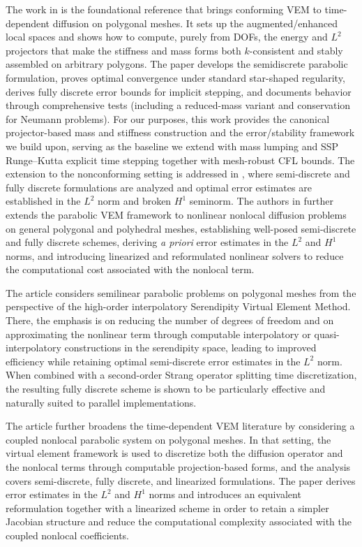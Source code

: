 \documentclass{article}
\begin{document}
The work in \cite{vacca2015parabolic} is the foundational reference that brings conforming VEM to time-dependent diffusion on polygonal meshes. It sets up the augmented/enhanced local spaces and shows how to compute, purely from DOFs, the energy and $L^2$ projectors that make the stiffness and mass forms both $k$-consistent and stably assembled on arbitrary polygons. The paper develops the semidiscrete parabolic formulation, proves optimal convergence under standard star-shaped regularity, derives fully discrete error bounds for implicit stepping, and documents behavior through comprehensive tests (including a reduced-mass variant and conservation for Neumann problems). For our purposes, this work provides the canonical projector-based mass and stiffness construction and the error/stability framework we build upon, serving as the baseline we extend with mass lumping and SSP Runge--Kutta explicit time stepping together with mesh-robust CFL bounds. The extension to the nonconforming setting is addressed in \cite{zhao2019nonconforming}, where semi-discrete and fully discrete formulations are analyzed and optimal error estimates are established in the $L^2$ norm and broken $H^1$ seminorm. The authors in \cite{adak2020nonlocal} further extends the parabolic VEM framework to nonlinear nonlocal diffusion problems on general polygonal and polyhedral meshes, establishing well-posed semi-discrete and fully discrete schemes, deriving \textit{a priori} error estimates in the $L^2$ and $H^1$ norms, and introducing linearized and reformulated nonlinear solvers to reduce the computational cost associated with the nonlocal term.

The article \cite{gomez2022serendipity} considers semilinear parabolic problems on polygonal meshes from the perspective of the high-order interpolatory Serendipity Virtual Element Method. There, the emphasis is on reducing the number of degrees of freedom and on approximating the nonlinear term through computable interpolatory or quasi-interpolatory constructions in the serendipity space, leading to improved efficiency while retaining optimal semi-discrete error estimates in the $L^2$ norm. When combined with a second-order Strang operator splitting time discretization, the resulting fully discrete scheme is shown to be particularly effective and naturally suited to parallel implementations.

The article \cite{arrutselvi2022nonlocal} further broadens the time-dependent VEM literature by considering a coupled nonlocal parabolic system on polygonal meshes. In that setting, the virtual element framework is used to discretize both the diffusion operator and the nonlocal terms through computable projection-based forms, and the analysis covers semi-discrete, fully discrete, and linearized formulations. The paper derives error estimates in the $L^2$ and $H^1$ norms and introduces an equivalent reformulation together with a linearized scheme in order to retain a simpler Jacobian structure and reduce the computational complexity associated with the coupled nonlocal coefficients. 
\end{document}
